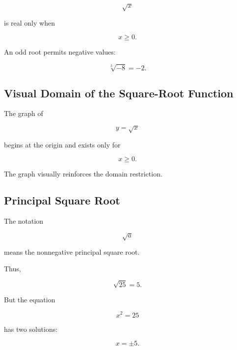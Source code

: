 \[ \sqrt{x} \]

is real only when

\[ x\geq0. \]

An odd root permits negative values:

\[ \sqrt[3]{-8}=-2. \]

\subsection{Visual Domain of the Square-Root Function}
\label{subsec:sqrt-domain-visual}

The graph of

\[ y=\sqrt{x} \]

begins at the origin and exists only for

\[ x\geq0. \]

\begin{center}
\end{center}

The graph visually reinforces the domain restriction.

\subsection{Principal Square Root}
\label{subsec:principal-square-root}

The notation

\[ \sqrt a \]

means the nonnegative principal square root.

Thus,

\[ \sqrt{25}=5. \]

But the equation

\[ x^2=25 \]

has two solutions:

\[ x=\pm5. \]

